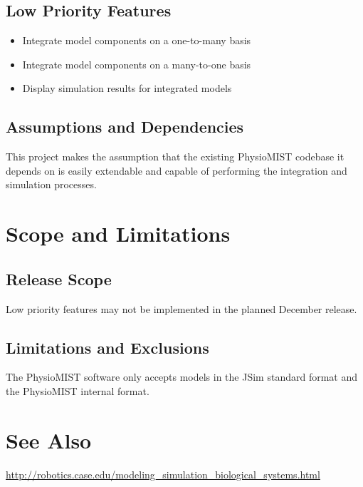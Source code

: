 \documentclass{article}
\begin{document}
\subsection{Low Priority Features}
\begin{itemize}
\item Integrate model components on a one-to-many basis
\item Integrate model components on a many-to-one basis
\item Display simulation results for integrated models
\end{itemize}
\subsection{Assumptions and Dependencies}
This project makes the assumption that the existing PhysioMIST codebase it depends on is easily extendable and capable of performing the integration and simulation processes.

\section{Scope and Limitations}
\subsection{Release Scope}
Low priority features may not be implemented in the planned December release.
\subsection{Limitations and Exclusions}
The PhysioMIST software only accepts models in the JSim standard format and the PhysioMIST internal format.

\section{See Also}
\url{http://robotics.case.edu/modeling_simulation_biological_systems.html}
\end{document}
